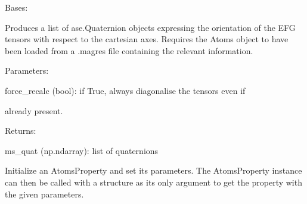 \documentclass[letterpaper,10pt,english]{sphinxmanual}
\begin{document}

\begin{fulllineitems}
\label{doctree/soprano.properties.nmr.efg:soprano.properties.nmr.efg.EFGQuaternion}
Bases: {\hyperref[doctree/soprano.properties.atomsproperty:soprano.properties.atomsproperty.AtomsProperty]{}}

Produces a list of ase.Quaternion objects expressing the orientation of
the EFG tensors with respect to the cartesian axes.
Requires the Atoms object to have been loaded from a .magres file
containing the relevant information.

\begin{DUlineblock}{0em}
\item[] Parameters:
\item[]
\begin{DUlineblock}{\DUlineblockindent}
\item[] force\_recalc (bool): if True, always diagonalise the tensors even if
\item[]
\begin{DUlineblock}{\DUlineblockindent}
\item[] already present.
\end{DUlineblock}
\end{DUlineblock}
\end{DUlineblock}

\begin{DUlineblock}{0em}
\item[] Returns:
\item[]
\begin{DUlineblock}{\DUlineblockindent}
\item[] ms\_quat (np.ndarray): list of quaternions
\end{DUlineblock}
\end{DUlineblock}

Initialize an AtomsProperty and set its parameters.
The AtomsProperty instance can then be called with a structure as its
only argument to get the property with the given parameters.


\end{fulllineitems}
\end{document}
